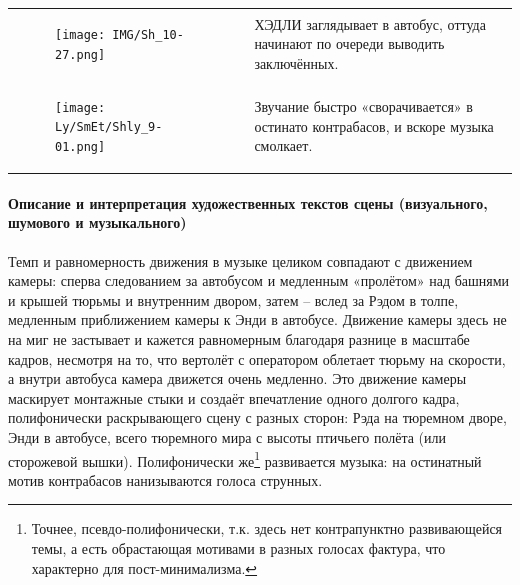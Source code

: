 \begin{longtable}[]{@{}ll@{}}
\begin{minipage}[t]{0.48\columnwidth}
\begin{figure}
\centering
\texttt{[image: IMG/Sh\_10-27.png]}
\caption{}
\end{figure}
\strut
\end{minipage} & \begin{minipage}[t]{0.48\columnwidth}\raggedright\strut
ХЭДЛИ заглядывает в автобус, оттуда начинают
по очереди выводить заключённых.\strut
\end{minipage}\tabularnewline
\begin{minipage}[t]{0.30\columnwidth}\raggedright\strut
\begin{figure}
\centering
\texttt{[image: Ly/SmEt/Shly\_9-01.png]}
\caption{}
\end{figure}
\strut
\end{minipage} & \begin{minipage}[t]{0.64\columnwidth}\raggedright\strut
Звучание быстро «сворачивается» в остинато контрабасов,
и вскоре музыка смолкает.\strut
\end{minipage}\tabularnewline
\bottomrule
\end{longtable}

\paragraph{Описание и интерпретация художественных текстов сцены (визуального, шумового и музыкального)}\label{ux43eux43fux438ux441ux430ux43dux438ux435-ux438-ux438ux43dux442ux435ux440ux43fux440ux435ux442ux430ux446ux438ux44f-ux445ux443ux434ux43eux436ux435ux441ux442ux432ux435ux43dux43dux44bux445-ux442ux435ux43aux441ux442ux43eux432-ux441ux446ux435ux43dux44b-ux432ux438ux437ux443ux430ux43bux44cux43dux43eux433ux43e-ux448ux443ux43cux43eux432ux43eux433ux43e-ux438-ux43cux443ux437ux44bux43aux430ux43bux44cux43dux43eux433ux43e-2}

Темп и равномерность движения в музыке целиком совпадают с движением камеры: сперва следованием за автобусом и медленным «пролётом» над башнями и крышей тюрьмы и внутренним двором, затем -- вслед за Рэдом в толпе, медленным приближением камеры к Энди в автобусе.
Движение камеры здесь не на миг не застывает и кажется равномерным благодаря разнице в масштабе кадров, несмотря на то, что вертолёт с оператором облетает тюрьму на скорости, а внутри автобуса камера движется очень медленно.
Это движение камеры маскирует монтажные стыки и создаёт впечатление одного долгого кадра, полифонически раскрывающего сцену с разных сторон: Рэда на тюремном дворе, Энди в автобусе, всего тюремного мира с высоты птичьего полёта (или сторожевой вышки).
Полифонически же\footnote{Точнее, псевдо-полифонически, т.к. здесь нет контрапунктно развивающейся темы, а есть обрастающая мотивами в разных голосах фактура, что характерно для пост-минимализма.} развивается музыка: на остинатный мотив контрабасов нанизываются голоса струнных.


